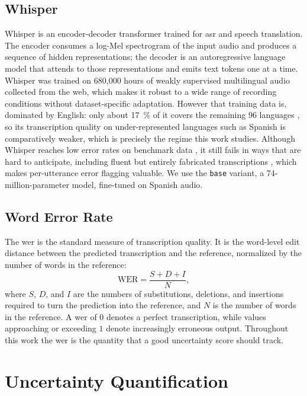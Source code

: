 \subsection{Whisper}
Whisper \cite{radford2023robust} is an encoder-decoder transformer trained for \acrshort{asr} and speech translation. The encoder consumes a log-Mel spectrogram of the input audio and produces a sequence of hidden representations; the decoder is an autoregressive language model that attends to those representations and emits text tokens one at a time. Whisper was trained on 680,000 hours of weakly supervised multilingual audio collected from the web, which makes it robust to a wide range of recording conditions without dataset-specific adaptation. However that training data is, dominated by English: only about \qty{17}{\percent} of it covers the remaining 96 languages \cite{radford2023robust}, so its transcription quality on under-represented languages such as Spanish is comparatively weaker, which is precisely the regime this work studies. Although Whisper reaches low error rates on benchmark data \cite{srivastav2025open}, it still fails in ways that are hard to anticipate, including fluent but entirely fabricated transcriptions \cite{koenecke2024careless}, which makes per-utterance error flagging valuable. We use the \texttt{base} variant, a 74-million-parameter model, fine-tuned on Spanish audio.

\subsection{Word Error Rate}
The \acrfull{wer} is the standard measure of transcription quality. It is the word-level edit distance between the predicted transcription and the reference, normalized by the number of words in the reference:
\begin{equation}
   \mathrm{WER} = \frac{S + D + I}{N},
\end{equation}
where $S$, $D$, and $I$ are the numbers of substitutions, deletions, and insertions required to turn the prediction into the reference, and $N$ is the number of words in the reference. A \acrshort{wer} of $0$ denotes a perfect transcription, while values approaching or exceeding $1$ denote increasingly erroneous output. Throughout this work the \acrshort{wer} is the quantity that a good uncertainty score should track.

\section{Uncertainty Quantification}\label{sec:unc_quantif}


